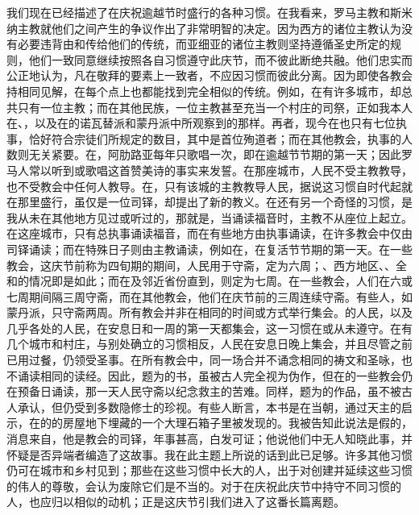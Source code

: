 我们现在已经描述了在庆祝逾越节时盛行的各种习惯。在我看来，罗马主教和斯米纳主教就他们之间产生的争议作出了非常明智的决定。因为西方的诸位主教认为没有必要违背由和传给他们的传统，而亚细亚的诸位主教则坚持遵循圣史所定的规则，他们一致同意继续按照各自习惯遵守此庆节，而不彼此断绝共融。他们忠实而公正地认为，凡在敬拜的要素上一致者，不应因习惯而彼此分离。因为即使各教会持相同见解，在每个点上也都能找到完全相似的传统。例如，在有许多城市，却总共只有一位主教；而在其他民族，一位主教甚至充当一个村庄的司祭，正如我本人在、，以及在的诺瓦替派和蒙丹派中所观察到的那样。再者，现今在也只有七位执事，恰好符合宗徒们所规定的数目，其中是首位殉道者；而在其他教会，执事的人数则无关紧要。在，阿肋路亚每年只歌唱一次，即在逾越节节期的第一天；因此罗马人常以听到或歌唱这首赞美诗的事实来发誓。在那座城市，人民不受主教教导，也不受教会中任何人教导。在，只有该城的主教教导人民，据说这习惯自时代起就在那里盛行，虽仅是一位司铎，却提出了新的教义。在还有另一个奇怪的习惯，是我从未在其他地方见过或听过的，那就是，当诵读福音时，主教不从座位上起立。在这座城市，只有总执事诵读福音，而在有些地方由执事诵读，在许多教会中仅由司铎诵读；而在特殊日子则由主教诵读，例如在，在复活节节期的第一天。在一些教会，这庆节前称为四旬期的期间，人民用于守斋，定为六周；、西方地区、、全和的情况即是如此；而在及邻近省份直到，则定为七周。在一些教会，人们在六或七周期间隔三周守斋，而在其他教会，他们在庆节前的三周连续守斋。有些人，如蒙丹派，只守斋两周。所有教会并非在相同的时间或方式举行集会。的人民，以及几乎各处的人民，在安息日和一周的第一天都集会，这一习惯在或从未遵守。在有几个城市和村庄，与别处确立的习惯相反，人民在安息日晚上集会，并且尽管之前已用过餐，仍领受圣事。在所有教会中，同一场合并不诵念相同的祷文和圣咏，也不诵读相同的读经。因此，题为的书，虽被古人完全视为伪作，但在的一些教会仍在预备日诵读，那一天人民守斋以纪念救主的苦难。同样，题为的作品，虽不被古人承认，但仍受到多数隐修士的珍视。有些人断言，本书是在当朝，通过天主的启示，在的的房屋地下埋藏的一个大理石箱子里被发现的。我被告知此说法是假的，消息来自，他是教会的司铎，年事甚高，白发可证；他说他们中无人知晓此事，并怀疑是否异端者编造了这故事。我在此主题上所说的话到此已足够。许多其他习惯仍可在城市和乡村见到；那些在这些习惯中长大的人，出于对创建并延续这些习惯的伟人的尊敬，会认为废除它们是不当的。对于在庆祝此庆节中持守不同习惯的人，也应归以相似的动机；正是这庆节引我们进入了这番长篇离题。\par

